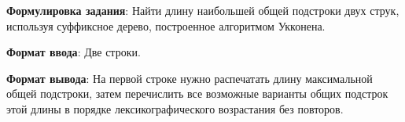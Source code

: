 
\textbf{Формулировка задания}: Найти длину наибольшей общей подстроки двух струк, используя суффиксное дерево, построенное алгоритмом Укконена.

\par

\textbf{Формат ввода}: Две строки. 

\textbf{Формат вывода}: На первой строке нужно распечатать длину максимальной общей подстроки, затем перечислить все возможные варианты общих подстрок этой длины в порядке лексикографического возрастания без повторов.  

\pagebreak
